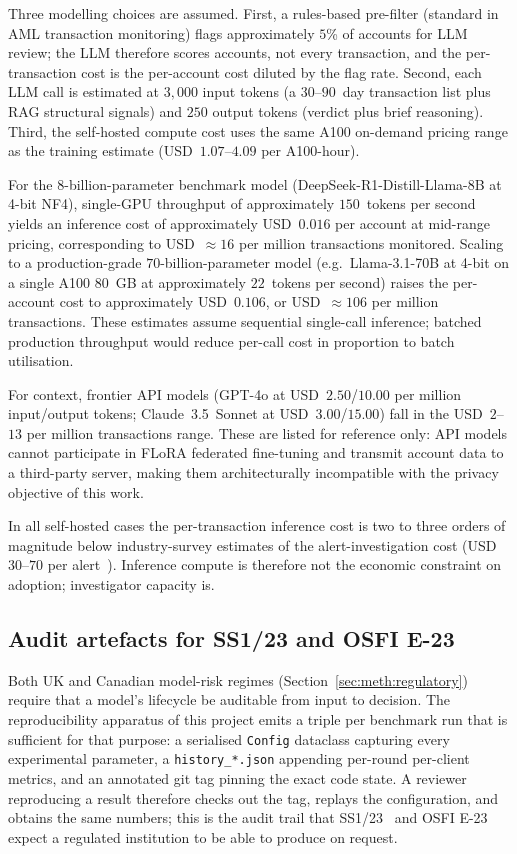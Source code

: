 \documentclass{report}
\begin{document}
Three modelling choices are assumed. First, a rules-based pre-filter (standard in AML transaction monitoring) flags approximately $5$\% of accounts for LLM review; the LLM therefore scores accounts, not every transaction, and the per-transaction cost is the per-account cost diluted by the flag rate. Second, each LLM call is estimated at $3{,}000$ input tokens (a $30$--$90$~day transaction list plus RAG structural signals) and $250$ output tokens (verdict plus brief reasoning). Third, the self-hosted compute cost uses the same A100 on-demand pricing range as the training estimate (USD~$1.07$--$4.09$ per A100-hour).

For the $8$-billion-parameter benchmark model (DeepSeek-R1-Distill-Llama-8B at 4-bit NF4), single-GPU throughput of approximately $150$~tokens per second yields an inference cost of approximately USD~$0.016$ per account at mid-range pricing, corresponding to USD~$\approx 16$ per million transactions monitored. Scaling to a production-grade $70$-billion-parameter model (e.g.\ Llama-3.1-70B at 4-bit on a single A100 80~GB at approximately $22$~tokens per second) raises the per-account cost to approximately USD~$0.106$, or USD~$\approx 106$ per million transactions. These estimates assume sequential single-call inference; batched production throughput would reduce per-call cost in proportion to batch utilisation.

For context, frontier API models (GPT-4o at USD~$2.50$/$10.00$ per million input/output tokens; Claude~3.5~Sonnet at USD~$3.00$/$15.00$) fall in the USD~$2$--$13$ per million transactions range. These are listed for reference only: API models cannot participate in FLoRA federated fine-tuning and transmit account data to a third-party server, making them architecturally incompatible with the privacy objective of this work.

In all self-hosted cases the per-transaction inference cost is two to three orders of magnitude below industry-survey estimates of the alert-investigation cost (USD~$30$--$70$ per alert~\cite{lexisnexis2024costukfc}). Inference compute is therefore not the economic constraint on adoption; investigator capacity is.

\subsection{Audit artefacts for SS1/23 and OSFI E-23}

Both UK and Canadian model-risk regimes (Section~\ref{sec:meth:regulatory}) require that a model's lifecycle be auditable from input to decision. The reproducibility apparatus of this project emits a triple per benchmark run that is sufficient for that purpose: a serialised \texttt{Config} dataclass capturing every experimental parameter, a \texttt{history\_*.json} appending per-round per-client metrics, and an annotated git tag pinning the exact code state. A reviewer reproducing a result therefore checks out the tag, replays the configuration, and obtains the same numbers; this is the audit trail that SS1/23~\cite{prass123} and OSFI E-23~\cite{osfie23} expect a regulated institution to be able to produce on request.
\end{document}
